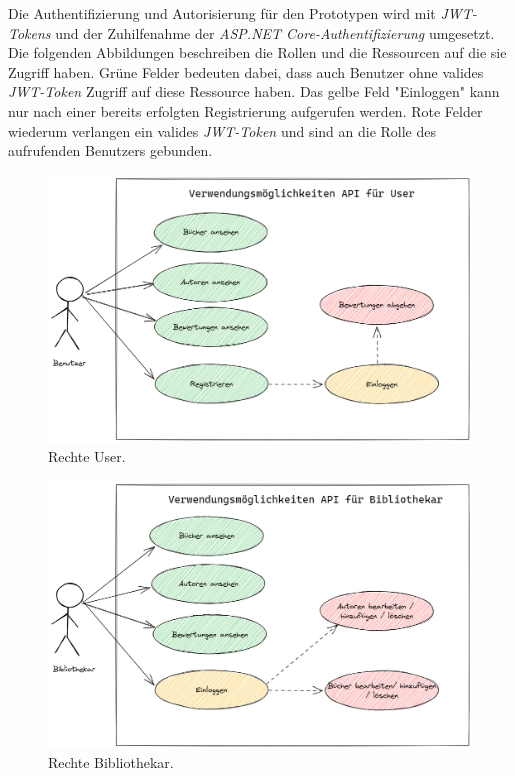 Die Authentifizierung und Autorisierung für den Prototypen wird mit \textit{JWT-Tokens} und der Zuhilfenahme der \textit{ASP.NET Core-Authentifizierung} umgesetzt.
Die folgenden Abbildungen beschreiben die Rollen und die Ressourcen auf die sie Zugriff haben.
Grüne Felder bedeuten dabei, dass auch Benutzer ohne valides \textit{JWT-Token} Zugriff auf diese Ressource haben.
Das gelbe Feld "Einloggen" kann nur nach einer bereits erfolgten Registrierung aufgerufen werden.
Rote Felder wiederum verlangen ein valides \textit{JWT-Token} und sind an die Rolle des aufrufenden Benutzers gebunden.

\begin{figure}[H]
    \includegraphics[width=\textwidth]{pics/UseCaseUser.png}
    \caption{Rechte User.}
\end{figure}

\begin{figure}[H]
    \includegraphics[width=\textwidth]{pics/UseCaseLibrarian.png}
    \caption{Rechte Bibliothekar.}
\end{figure}

